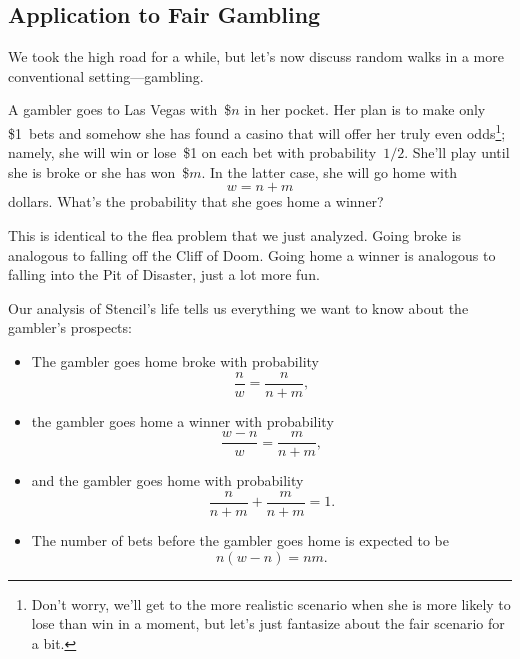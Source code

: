 \subsection{Application to Fair Gambling}

We took the high road for a while, but let's now discuss random walks
in a more conventional setting---gambling.

A gambler goes to Las Vegas with~\$$n$ in her pocket.  Her plan is to
make only \$1~bets and somehow she has found a casino that will offer
her truly even odds\footnote{Don't worry, we'll get to the more
  realistic scenario when she is more likely to lose than win in a
  moment, but let's just fantasize about the fair scenario for a
  bit.}; namely, she will win or lose~\$1 on each bet with
probability~$1/2$. She'll play until she is broke or she has
won~\$$m$.  In the latter case, she will go home with
\begin{equation*}
    w = n + m
\end{equation*}
dollars. What's the probability that she goes home a winner?

This is identical to the flea problem that we just analyzed.  Going
broke is analogous to falling off the Cliff of Doom.  Going home a
winner is analogous to falling into the Pit of Disaster, just a lot
more fun.

Our analysis of Stencil's life tells us everything we want to know
about the gambler's prospects:
\begin{itemize}

\item

The gambler goes home broke with probability
\begin{equation*}
    \frac{n}{w} = \frac{n}{n + m},
\end{equation*}

\item

the gambler goes home a winner with probability
\begin{equation*}
    \frac{w - n}{w} = \frac{m}{n + m},
\end{equation*}

\item

and the gambler goes home with probability
\begin{equation*}
    \frac{n}{n + m} + \frac{m}{n + m} = 1.
\end{equation*}

\item

The number of bets before the gambler goes home is expected to be
\begin{equation*}
    n (w - n) = nm.
\end{equation*}

\end{itemize}

